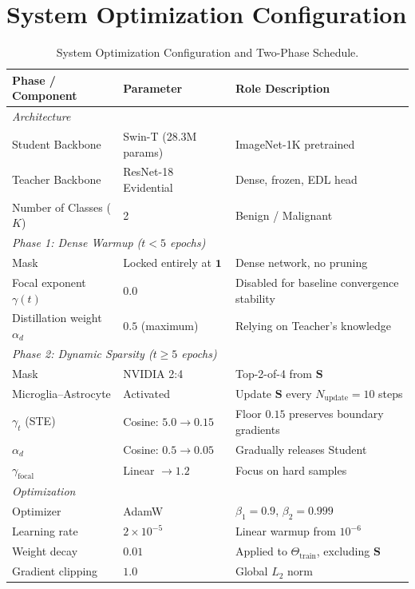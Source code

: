 \documentclass[letterpaper]{article} %
\begin{document}
\section{System Optimization Configuration}
\begin{table}[H]
\centering
\caption{System Optimization Configuration and Two-Phase Schedule.}
\label{tab:config}
\begin{tabular}{@{}lll@{}}
\toprule
\textbf{Phase / Component} & \textbf{Parameter} & \textbf{Role Description} \\
\midrule
\multicolumn{3}{l}{\emph{Architecture}} \\
Student Backbone & Swin-T (28.3M params) & ImageNet-1K pretrained \\
Teacher Backbone & ResNet-18 Evidential & Dense, frozen, EDL head \\
Number of Classes ($K$) & 2 & Benign / Malignant \\
\midrule
\multicolumn{3}{l}{\emph{Phase 1: Dense Warmup ($t < 5$ epochs)}} \\
Mask & Locked entirely at $\bm{1}$ & Dense network, no pruning \\
Focal exponent $\gamma(t)$ & $0.0$ & Disabled for baseline convergence stability \\
Distillation weight $\alpha_d$ & $0.5$ (maximum) & Relying on Teacher's knowledge \\
\midrule
\multicolumn{3}{l}{\emph{Phase 2: Dynamic Sparsity ($t \ge 5$ epochs)}} \\
Mask & NVIDIA 2:4 & Top-2-of-4 from $\bm{S}$ \\
Microglia--Astrocyte & Activated & Update $\bm{S}$ every $N_{\text{update}} = 10$ steps \\
$\gamma_t$ (STE) & Cosine: $5.0 \to 0.15$ & Floor $0.15$ preserves boundary gradients \\
$\alpha_d$ & Cosine: $0.5 \to 0.05$ & Gradually releases Student \\
$\gamma_{\text{focal}}$ & Linear $\to 1.2$ & Focus on hard samples \\
\midrule
\multicolumn{3}{l}{\emph{Optimization}} \\
Optimizer & AdamW~\cite{loshchilov2019decoupled, kingma2015adam} & $\beta_1=0.9$, $\beta_2=0.999$ \\
Learning rate & $2 \times 10^{-5}$ & Linear warmup from $10^{-6}$ \\
Weight decay & $0.01$ & Applied to $\Theta_{\text{train}}$, excluding $\bm{S}$ \\
Gradient clipping & $1.0$ & Global $L_2$ norm \\

\end{tabular}
\end{table}
\end{document}
